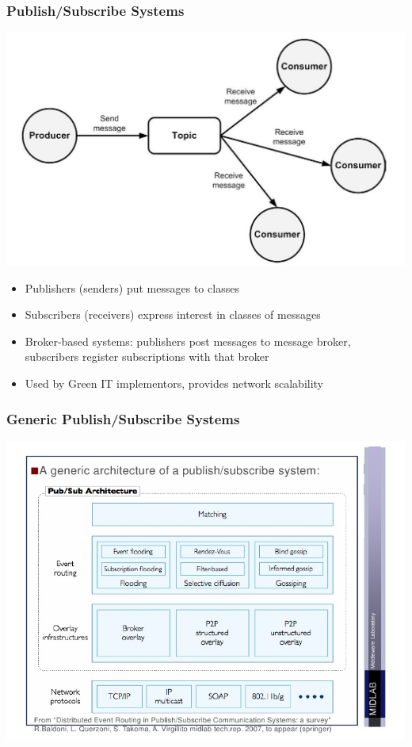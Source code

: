 \documentclass{beamer}
\begin{document}
\begin{frame}
\frametitle{Publish/Subscribe Systems}
\includegraphics[scale=0.3]{publish_subscribe.jpg}
\begin{itemize}
\item Publishers (senders) put messages to classes
\item Subscribers (receivers) express interest in classes of messages
\item Broker-based systems: publishers post messages to message broker, subscribers register subscriptions with that broker 
\item Used by Green IT implementors, provides network scalability
\end{itemize}
\end{frame}

\begin{frame}
\frametitle{Generic Publish/Subscribe Systems}
\includegraphics[scale=0.45]{generic_pub_sub.jpg}
\end{frame}
\end{document}
